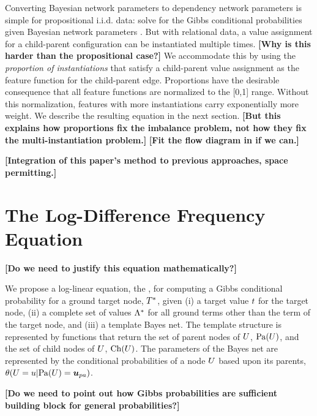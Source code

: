 \documentclass[runningheads,a4paper]{llncs}
\newcommand{\fixneeded}[1]{\textbf{[\footnotesize #1]}}
\newcommand{\iid}{i.i.d.}
\begin{document}
Converting Bayesian network parameters to dependency network parameters is simple for propositional \iid{} data: solve for the Gibbs conditional probabilities given Bayesian network parameters \cite[Ch.14.5.2]{Russell2010}. But with relational data, a value assignment for a child-parent configuration can be instantiated multiple times. \fixneeded{Why is this harder than the propositional case?} We accommodate this by using the {\em proportion of instantiations} that satisfy a child-parent value assignment as the feature function for the child-parent edge. Proportions have the desirable consequence that all feature functions are normalized to the [0,1] range. Without this normalization, features with more instantiations carry exponentially more weight. We describe the resulting equation in the next section.
\fixneeded{But this explains how proportions fix the imbalance problem, not how they fix the multi-instantiation problem.}
\fixneeded{Fit the flow diagram in if we can.}  %

\fixneeded{Integration of this paper's method to previous approaches, space permitting.}

\section{The Log-Difference Frequency Equation} 
\label{sec:theequation}

\fixneeded{Do we need to justify this equation mathematically?}

We propose a log-linear equation, the , for computing a Gibbs conditional probability for a ground target node, $T^{*}\hspace{0.0ex}$, given (i) a target value $t$ for the target node, (ii) a complete set of values $\Lambda^{*}\hspace{0.0ex}$ for all ground terms other than the term of the target node, and (iii) a template Bayes net. The template structure is represented by functions that return the set of parent nodes of $U$, $\mathrm{Pa}(U)$, and the set of child nodes of $U$, $\mathrm{Ch}(U)$. The parameters of the Bayes net are
represented by the conditional probabilities of a node $U$ based upon its parents, $\cprob{\UT = \UV}{\Pa{\UT} = \Prange{\UT}}$.

\fixneeded{Do we need to point out how Gibbs probabilities are sufficient building block for general probabilities?}
\end{document}
